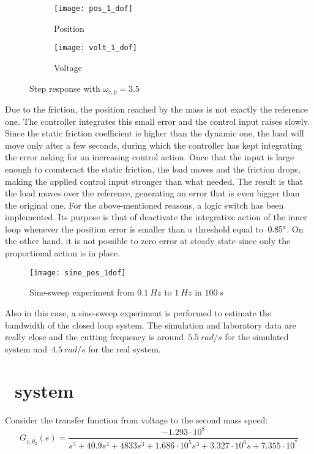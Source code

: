 \begin{figure*}[h]
	\centering
	\begin{subfigure}{0.45\columnwidth}
		\texttt{[image: pos\_1\_dof]}
		\caption{Position}
	\end{subfigure}
	\begin{subfigure}{0.45\columnwidth}
		\texttt{[image: volt\_1\_dof]}
		\caption{Voltage}
	\end{subfigure}
	\caption{Step response with $\omega_{c,p}=3.5$}
	\label{fig:Pos_1dof_3.5}
\end{figure*}

\newpage
Due to the friction, the position reached by the mass is not exactly the reference one. The controller integrates this small error and the control input raises slowly. Since the static friction coefficient is higher than the dynamic one, the load will move only after a few seconds, during which the controller has kept integrating the error asking for an increasing control action.
Once that the input is large enough to counteract the static friction, the load moves and the friction drops, making the applied control input stronger than what needed. The result is that the load moves over the reference, generating an error that is even bigger than the original one.
For the above-mentioned reasons, a logic switch has been implemented. Its purpose is that of deactivate the integrative action of the inner loop whenever the position error is smaller than a threshold equal to~$0.85 \degree$. On the other hand, it is not possible to zero error at steady state since only the proportional action is in place.
\begin{figure*}[h]
	\centering
	\texttt{[image: sine\_pos\_1dof]}
	\caption{Sine-sweep experiment from $0.1\ Hz$ to $1\ Hz$ in $100\ s$}
	\label{fig:sinesweep_pos_1dof}
\end{figure*}

Also in this case, a sine-sweep experiment is performed to estimate the bandwidth of the closed loop system. The simulation and laboratory data are really close and the cutting frequency is around~$5.5\ rad/s$ for the simulated system and~$4.5\ rad/s$ for the real system.
\newpage
\section{\twodof\ system}
Consider the transfer function from voltage to the second mass speed:
\[
G_{v,\dot{\theta}_2}(s)=
\frac{-1.293 \cdot 10^{8}}{s^5+40.9s^{4}+4833s^{3}+1.686 \cdot 10^{5} s^{3}+3.327 \cdot 10^{6} s+7.355 \cdot 10^{7}}
\]

